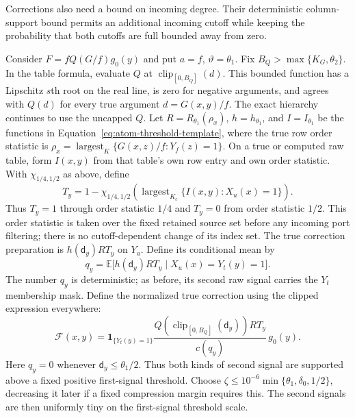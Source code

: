 Corrections also need a bound on incoming degree.  Their deterministic
column-support bound permits an additional incoming cutoff while keeping
the probability that both cutoffs are full bounded away from zero.

Consider $F=fQ(G/f)g_0(y)$ and put $a=f$, $\vartheta=\theta_1$.
Fix $B_Q>\max\{K_G,\theta_2\}$. In the table formula, evaluate $Q$
at $\operatorname{clip}_{[0,B_Q]}(d)$. This bounded function has a
Lipschitz $s$th root on the real line, is zero for negative arguments,
and agrees with $Q(d)$ for every true argument $d=G(x,y)/f$.
The exact hierarchy continues to use the uncapped $Q$.  Let $R=R_{\theta_1}(\rho_x)$, $h=h_{\theta_1}$, and
$I=I_{\theta_1}$ be the functions in
Equation~\eqref{eq:atom-threshold-template}, where the true row order statistic is
$\rho_x=\operatorname{largest}_K\{G(x,z)/f:Y_f(z)=1\}$.
On a true or computed raw table, form $I(x,y)$ from that table's own row
entry and own order statistic.
With $\chi_{1/4,1/2}$ as above, define
\begin{equation}
 T_y=1-\chi_{1/4,1/2}\left(
       \operatorname{largest}_{K_c}\{I(x,y):X_u(x)=1\}\right).
 \label{eq:atom-incoming-gate}
\end{equation}
Thus $T_y=1$ through order statistic $1/4$ and $T_y=0$ from order statistic $1/2$.
This order statistic is taken over the fixed retained source set before any incoming
port filtering; there is no cutoff-dependent change of its index set.
The true correction preparation is $h(\mathsf{d}_y)R T_y$ on $Y_a$.
Define its conditional mean by
\begin{equation}
 q_y=\mathbb E\bigl[h(\mathsf{d}_y)R T_y\mid X_u(x)=Y_t(y)=1\bigr].
 \label{eq:atom-correction-denominator}
\end{equation}
The number $q_y$ is deterministic; as before, its second raw signal
carries the $Y_t$ membership mask.  Define the normalized true correction
using the clipped expression everywhere:
\begin{equation}
 \mathcal F(x,y)=\mathbf1_{\{Y_t(y)=1\}}
     \frac{Q(\operatorname{clip}_{[0,B_Q]}(\mathsf{d}_y))R T_y}{c(q_y)}\,g_0(y).
 \label{eq:atom-correction-table}
\end{equation}
Here $q_y=0$ whenever $\mathsf{d}_y\le\theta_1/2$.  Thus both kinds of second
signal are supported above a fixed positive first-signal threshold.
Choose $\zeta\le10^{-6}\min\{\theta_1,\delta_0,1/2\}$, decreasing it
later if a fixed compression margin requires this.  The second signals
are then uniformly tiny on the first-signal threshold scale.

